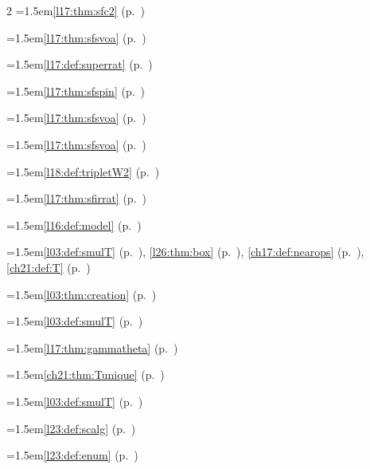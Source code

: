 \begin{multicols}{2}
\hangindent=1.5em\quad \ref{l17:thm:sfc2} (p.~\pageref{l17:thm:sfc2})\par
\hangindent=1.5em\quad \ref{l17:thm:sfsvoa} (p.~\pageref{l17:thm:sfsvoa})\par
\hangindent=1.5em\quad \ref{l17:def:superrat} (p.~\pageref{l17:def:superrat})\par
\hangindent=1.5em\quad \ref{l17:thm:sfspin} (p.~\pageref{l17:thm:sfspin})\par
\hangindent=1.5em\quad \ref{l17:thm:sfsvoa} (p.~\pageref{l17:thm:sfsvoa})\par
\hangindent=1.5em\quad \ref{l17:thm:sfsvoa} (p.~\pageref{l17:thm:sfsvoa})\par
\hangindent=1.5em\quad \ref{l18:def:tripletW2} (p.~\pageref{l18:def:tripletW2})\par
\hangindent=1.5em\quad \ref{l17:thm:sfirrat} (p.~\pageref{l17:thm:sfirrat})\par
\hangindent=1.5em\quad \ref{l16:def:model} (p.~\pageref{l16:def:model})\par
\par{}\par\nopagebreak\smallskip
\hangindent=1.5em\quad \ref{l03:def:smulT} (p.~\pageref{l03:def:smulT}), \ref{l26:thm:box} (p.~\pageref{l26:thm:box}), \ref{ch17:def:nearops} (p.~\pageref{ch17:def:nearops}), \ref{ch21:def:T} (p.~\pageref{ch21:def:T})\par
\hangindent=1.5em\quad \ref{l03:thm:creation} (p.~\pageref{l03:thm:creation})\par
\hangindent=1.5em\quad \ref{l03:def:smulT} (p.~\pageref{l03:def:smulT})\par
\hangindent=1.5em\quad \ref{l17:thm:gammatheta} (p.~\pageref{l17:thm:gammatheta})\par
\hangindent=1.5em\quad \ref{ch21:thm:Tunique} (p.~\pageref{ch21:thm:Tunique})\par
\hangindent=1.5em\quad \ref{l03:def:smulT} (p.~\pageref{l03:def:smulT})\par
\hangindent=1.5em\quad \ref{l23:def:scalg} (p.~\pageref{l23:def:scalg})\par
\hangindent=1.5em\quad \ref{l23:def:enum} (p.~\pageref{l23:def:enum})\par

\end{multicols}
